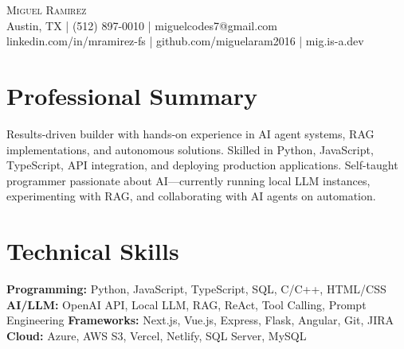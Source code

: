 \documentclass[letterpaper,10pt]{article}
\begin{document}
\begin{center}
  {\Large \scshape Miguel Ramirez} \\ \vspace{0pt}
  Austin, TX | (512) 897-0010 | miguelcodes7@gmail.com \\ 
  linkedin.com/in/mramirez-fs | github.com/miguelaram2016 | mig.is-a.dev
\end{center}

\section*{Professional Summary}
Results-driven builder with hands-on experience in AI agent systems, RAG implementations, and autonomous solutions. Skilled in Python, JavaScript, TypeScript, API integration, and deploying production applications. Self-taught programmer passionate about AI—currently running local LLM instances, experimenting with RAG, and collaborating with AI agents on automation.

\section*{Technical Skills}
\textbf{Programming:} Python, JavaScript, TypeScript, SQL, C/C++, HTML/CSS \newline
\textbf{AI/LLM:} OpenAI API, Local LLM, RAG, ReAct, Tool Calling, Prompt Engineering \newline
\textbf{Frameworks:} Next.js, Vue.js, Express, Flask, Angular, Git, JIRA \newline
\textbf{Cloud:} Azure, AWS S3, Vercel, Netlify, SQL Server, MySQL
\end{document}
